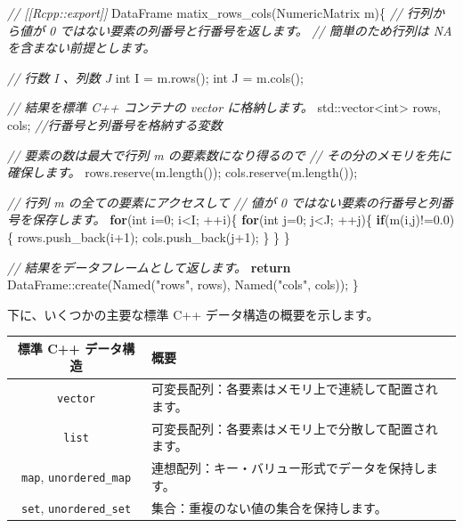\documentclass[]{book}
\newenvironment{Shaded}{\begin{snugshade}}{\end{snugshade}}
\newcommand{\BuiltInTok}[1]{#1}
\newcommand{\CommentTok}[1]{\textcolor[rgb]{0.56,0.35,0.01}{\textit{#1}}}
\newcommand{\ControlFlowTok}[1]{\textcolor[rgb]{0.13,0.29,0.53}{\textbf{#1}}}
\newcommand{\DataTypeTok}[1]{\textcolor[rgb]{0.13,0.29,0.53}{#1}}
\newcommand{\DecValTok}[1]{\textcolor[rgb]{0.00,0.00,0.81}{#1}}
\newcommand{\FloatTok}[1]{\textcolor[rgb]{0.00,0.00,0.81}{#1}}
\newcommand{\NormalTok}[1]{#1}
\newcommand{\StringTok}[1]{\textcolor[rgb]{0.31,0.60,0.02}{#1}}
\begin{document}
\begin{Shaded}
\begin{Highlighting}[]
\CommentTok{// [[Rcpp::export]]}
\NormalTok{DataFrame matix_rows_cols(NumericMatrix m)\{}
    \CommentTok{// 行列から値が 0 ではない要素の列番号と行番号を返します。}
    \CommentTok{// 簡単のため行列は NA を含まない前提とします。}

    \CommentTok{// 行数 I 、列数 J}
    \DataTypeTok{int}\NormalTok{ I = m.rows();}
    \DataTypeTok{int}\NormalTok{ J = m.cols();}

    \CommentTok{// 結果を標準 C++ コンテナの vector に格納します。}
    \BuiltInTok{std::}\NormalTok{vector<}\DataTypeTok{int}\NormalTok{> rows, cols; }\CommentTok{//行番号と列番号を格納する変数}

    \CommentTok{// 要素の数は最大で行列 m の要素数になり得るので}
    \CommentTok{// その分のメモリを先に確保します。}
\NormalTok{    rows.reserve(m.length());}
\NormalTok{    cols.reserve(m.length());}

    \CommentTok{// 行列 m の全ての要素にアクセスして}
    \CommentTok{// 値が 0 ではない要素の行番号と列番号を保存します。}
    \ControlFlowTok{for}\NormalTok{(}\DataTypeTok{int}\NormalTok{ i=}\DecValTok{0}\NormalTok{; i<I; ++i)\{}
        \ControlFlowTok{for}\NormalTok{(}\DataTypeTok{int}\NormalTok{ j=}\DecValTok{0}\NormalTok{; j<J; ++j)\{}
            \ControlFlowTok{if}\NormalTok{(m(i,j)!=}\FloatTok{0.0}\NormalTok{)\{}
\NormalTok{                rows.push_back(i}\DecValTok{+1}\NormalTok{);}
\NormalTok{                cols.push_back(j}\DecValTok{+1}\NormalTok{);}
\NormalTok{            \}}
\NormalTok{        \}}
\NormalTok{    \}}

    \CommentTok{// 結果をデータフレームとして返します。}
    \ControlFlowTok{return}\NormalTok{ DataFrame::create(Named(}\StringTok{"rows"}\NormalTok{, rows),}
\NormalTok{                             Named(}\StringTok{"cols"}\NormalTok{, cols));}
\NormalTok{\}}
\end{Highlighting}
\end{Shaded}

下に、いくつかの主要な標準 C++ データ構造の概要を示します。

\begin{longtable}[]{@{}cl@{}}
\toprule
標準 C++ データ構造 & 概要\tabularnewline
\midrule
\endhead
\texttt{vector} & 可変長配列：各要素はメモリ上で連続して配置されます。\tabularnewline
\texttt{list} & 可変長配列：各要素はメモリ上で分散して配置されます。\tabularnewline
\texttt{map}, \texttt{unordered\_map} & 連想配列：キー・バリュー形式でデータを保持します。\tabularnewline
\texttt{set}, \texttt{unordered\_set} & 集合：重複のない値の集合を保持します。\tabularnewline
\bottomrule
\end{longtable}
\end{document}
